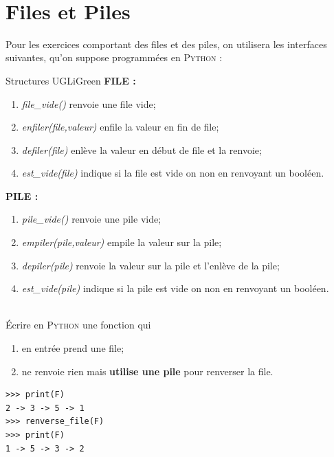 \documentclass[a4paper,10pt,french]{book}
\begin{document}
\\

\section*{Files et Piles}
Pour les exercices comportant des files et des piles, on utilisera les interfaces suivantes, qu'on suppose programmées en \textsc{Python} : 

\begin{encadrecolore}{Structures }{UGLiGreen}
\textbf{FILE :}
    \begin{enumerate}[--]
        \item \textit{file\_vide()} renvoie une file vide;
        \item \textit{enfiler(file,valeur)} enfile la valeur en fin de file;
        \item  \textit{defiler(file)} enlève la valeur en début de file et la renvoie;
        \item \textit{est\_vide(file)} indique si la file est vide on non en renvoyant un booléen.
    \end{enumerate}


\textbf{PILE :}
    \begin{enumerate}[--]
        \item \textit{pile\_vide()} renvoie une pile vide;
        \item \textit{empiler(pile,valeur)} empile la valeur sur la pile;
        \item  \textit{depiler(pile)} renvoie la valeur sur la pile et l'enlève de la pile;
        \item \textit{est\_vide(pile)} indique si la pile est vide on non en renvoyant un booléen.	
    \end{enumerate}
\end{encadrecolore}
    
\exo\\

\'Ecrire en \textsc{Python} une fonction  qui
\begin{enumerate}[--]
    \item 	en entrée prend une file;
    \item 	ne renvoie rien mais \textbf{utilise une pile} pour renverser la file.
\end{enumerate}
\begin{exemple}[ d'utilisation]
\begin{verbatim}
>>> print(F)
2 -> 3 -> 5 -> 1
>>> renverse_file(F)
>>> print(F)
1 -> 5 -> 3 -> 2
\end{verbatim}    
\end{exemple}
\end{document}
